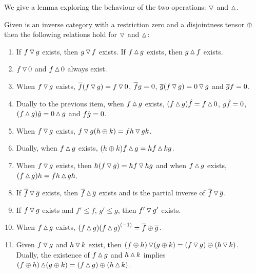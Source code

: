 We give a lemma exploring the
behaviour of the two operations: $\tjleft$ and $\tjright$.

\begin{lemma}\label{lem:properties_of_tjleft_and_tjright}
  Given \X is an inverse category with a restriction zero and a disjointness tensor $\+$ then the
  following relations hold for $\tjleft$ and $\tjright$:
   \begin{enumerate}[{(}i{)}]
    \item If $f \tjleft g$ exists, then $g \tjleft f$ exists. If $f \tjright g$ exists, then
    $g \tjright f$ exists. \label{lemitem:l_r_commute}
    \item $f \tjleft 0$ and $f \tjright 0$ always exist. \label{lemitem:l_r_zero_exists}
    \item When $f\tjleft g$ exists, $\rst{f}(f\tjleft g) = f \tjleft 0$, $\rst{f}g = 0$,
    $\rst{g}(f \tjleft g) = 0 \tjleft g$ and $\rst{g}f = 0$.\label{lemitem:l_r_rst_orthogonal_to_zero}
    \item Dually to the previous item, when $f\tjright g$ exists,
    $(f\tjright g)\rg{f} = f \tjright 0$, $g\rg{f} = 0$,
    $(f \tjright g)\rg{g} = 0 \tjright g$ and $f\rg{g} = 0$.\label{lemitem:l_r_rg_orthogonal_to_zero}
    \item When $f\tjleft g$ exists, $f\tjleft g (h\+k) = f h \tjleft g k$.
      \label{lemitem:l_r_l_pull_right}
    \item Dually, when $f \tjright g$ exists, $(h \+ k) f \tjright g = h f \tjright k g$.
      \label{lemitem:l_r_r_pull_left}
    \item When $f \tjleft g$ exists, then $h(f \tjleft g) = h f \tjleft hg$ and when $f \tjright g$
      exists, $(f \tjright g)h = f h \tjright g h$.
      \label{lemitem:l_r_l_universal_r_stable}
    \item If $\rst{f} \tjleft \rst{g}$ exists, then $\rst{f} \tjright \rst{g}$ exists and is
      the partial inverse of $\rst{f} \tjleft \rst{g}$.
      \label{lemitem:l_r_rst_inverses}
    \item If $f\tjleft g$ exists and $f' \le f$, $g' \le g$, then $f' \tjleft g'$ exists.
      \label{lemitem:l_r_less_than}
    \item When $f\tjright g$ exists, $(f\tjright g) \inv{(f\tjright g)} = \rst{f}\+\rst{g}$.
      \label{lemitem:l_r_rst_is_natural}
    \item Given $f\tjleft g$ and $h\tjleft k$ exist, then
      $(f\+h)\tjleft(g\+k) = (f\tjleft g)\+ (h\tjleft k)$. Dually, the existence of $f\tjright g$
      and $h\tjright k$ implies $(f\+h)\tjright(g\+k) = (f\tjright g)\+ (h\tjright k)$.
      \label{lemitem:l_r_preserve_tensor}
  \end{enumerate}
\end{lemma}
